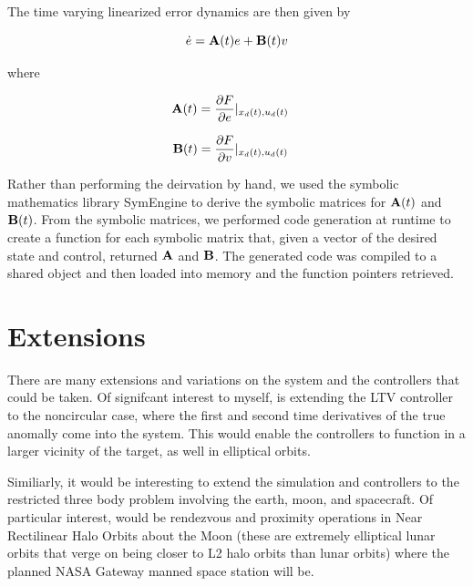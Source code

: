 \documentclass[conference]{IEEEtran}
\begin{document}
The time varying linearized error dynamics are then given by

\begin{equation}
    \label{eq:nonlinear-error-dynamics-lvi}
    \dot{e} = {\bf A}(t)e + {\bf B}(t)v
\end{equation}

where

\begin{equation}
    \label{eq:ltvA}
    \begin{aligned}
        {\bf A}(t) &= \frac{\partial F}{\partial e}|_{x_d(t),u_d(t)}
    \end{aligned}
\end{equation}

\begin{equation}
    \label{eq:ltvB}
    \begin{aligned}
        {\bf B}(t) &= \frac{\partial F}{\partial v}|_{x_d(t),u_d(t)}
    \end{aligned}
\end{equation}

Rather than performing the deirvation by hand, we used the symbolic mathematics
library SymEngine  to derive the symbolic matrices for
${\bf A}(t)$ and ${\bf B}(t)$. From the symbolic matrices, we performed code
generation at runtime to create a function for each symbolic matrix that, given
a vector of the desired state and control, returned ${\bf A}$ and ${\bf B}$.
The generated code was compiled to a shared object and then loaded into memory
and the function pointers retrieved.


\section{Extensions}

There are many extensions and variations on the system and the controllers that
could be taken. Of signifcant interest to myself, is extending the LTV
controller to the noncircular case, where the first and second time derivatives
of the true anomally come into the system. This would enable the controllers to
function in a larger vicinity of the target, as well in elliptical orbits.

Similiarly, it would be interesting to extend the simulation and controllers to
the restricted three body problem involving the earth, moon, and spacecraft. Of
particular interest, would be rendezvous and proximity operations in Near
Rectilinear Halo Orbits about the Moon (these are extremely elliptical lunar
orbits that verge on being closer to L2 halo orbits than lunar orbits) where
the planned NASA Gateway manned space station will be.



\end{document}
